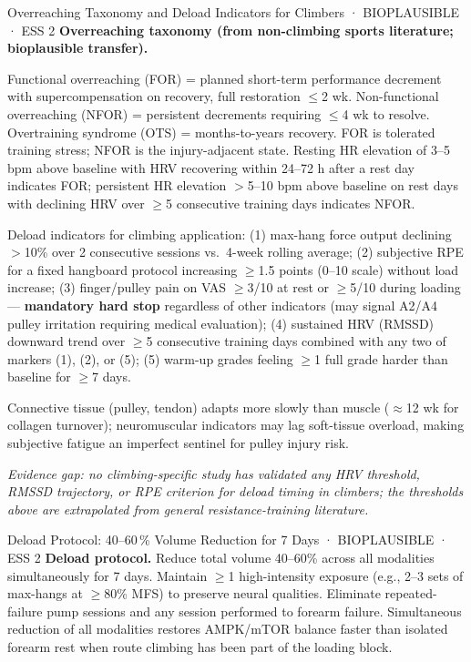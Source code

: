 \begin{bioplausbox}{Overreaching Taxonomy and Deload Indicators for Climbers · BIOPLAUSIBLE · ESS 2}
\textbf{Overreaching taxonomy (from non-climbing sports literature; bioplausible transfer).}

Functional overreaching (FOR) = planned short-term performance decrement with supercompensation on recovery, full restoration $\leq$2 wk. Non-functional overreaching (NFOR) = persistent decrements requiring $\leq$4 wk to resolve. Overtraining syndrome (OTS) = months-to-years recovery. FOR is tolerated training stress; NFOR is the injury-adjacent state. Resting HR elevation of 3–5 bpm above baseline with HRV recovering within 24–72 h after a rest day indicates FOR; persistent HR elevation $>$5–10 bpm above baseline on rest days with declining HRV over $\geq$5 consecutive training days indicates NFOR.

Deload indicators for climbing application: (1) max-hang force output declining $>$10\% over 2 consecutive sessions vs.\ 4-week rolling average; (2) subjective RPE for a fixed hangboard protocol increasing $\geq$1.5 points (0–10 scale) without load increase; (3) finger/pulley pain on VAS $\geq$3/10 at rest or $\geq$5/10 during loading — \textbf{mandatory hard stop} regardless of other indicators (may signal A2/A4 pulley irritation requiring medical evaluation); (4) sustained HRV (RMSSD) downward trend over $\geq$5 consecutive training days combined with any two of markers (1), (2), or (5); (5) warm-up grades feeling $\geq$1 full grade harder than baseline for $\geq$7 days.

Connective tissue (pulley, tendon) adapts more slowly than muscle ($\approx$12 wk for collagen turnover); neuromuscular indicators may lag soft-tissue overload, making subjective fatigue an imperfect sentinel for pulley injury risk.

\textit{Evidence gap: no climbing-specific study has validated any HRV threshold, RMSSD trajectory, or RPE criterion for deload timing in climbers; the thresholds above are extrapolated from general resistance-training literature.}
\end{bioplausbox}

\begin{bioplausbox}{Deload Protocol: 40--60\,\% Volume Reduction for 7 Days · BIOPLAUSIBLE · ESS 2}
\textbf{Deload protocol.} Reduce total volume 40–60\% across all modalities simultaneously for 7 days. Maintain $\geq$1 high-intensity exposure (e.g., 2–3 sets of max-hangs at $\geq$80\% MFS) to preserve neural qualities. Eliminate repeated-failure pump sessions and any session performed to forearm failure. Simultaneous reduction of all modalities restores AMPK/mTOR balance faster than isolated forearm rest when route climbing has been part of the loading block.
\end{bioplausbox}

